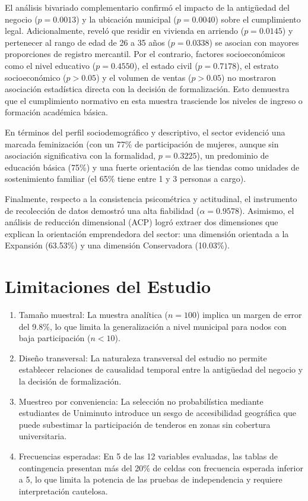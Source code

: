 \documentclass[11pt,a4paper]{article}
\begin{document}
\par
El análisis bivariado complementario confirmó el impacto de la antigüedad del negocio ($p = 0.0013$) y la ubicación municipal ($p = 0.0040$) sobre el cumplimiento legal. Adicionalmente, reveló que residir en vivienda en arriendo ($p = 0.0145$) y pertenecer al rango de edad de 26 a 35 años ($p = 0.0338$) se asocian con mayores proporciones de registro mercantil. Por el contrario, factores socioeconómicos como el nivel educativo ($p = 0.4550$), el estado civil ($p = 0.7178$), el estrato socioeconómico ($p > 0.05$) y el volumen de ventas ($p > 0.05$) no mostraron asociación estadística directa con la decisión de formalización. Esto demuestra que el cumplimiento normativo en esta muestra trasciende los niveles de ingreso o formación académica básica.

\par
En términos del perfil sociodemográfico y descriptivo, el sector evidenció una marcada feminización (con un 77\% de participación de mujeres, aunque sin asociación significativa con la formalidad, $p = 0.3225$), un predominio de educación básica (75\%) y una fuerte orientación de las tiendas como unidades de sostenimiento familiar (el 65\% tiene entre 1 y 3 personas a cargo).

\par
Finalmente, respecto a la consistencia psicométrica y actitudinal, el instrumento de recolección de datos demostró una alta fiabilidad ($\alpha = 0.9578$). Asimismo, el análisis de reducción dimensional (ACP) logró extraer dos dimensiones que explican la orientación emprendedora del sector: una dimensión orientada a la Expansión (63.53\%) y una dimensión Conservadora (10.03\%).

\section{Limitaciones del Estudio}
\begin{enumerate}
    \item Tamaño muestral: La muestra analítica ($n = 100$) implica un margen de error del 9.8\%, lo que limita la generalización a nivel municipal para nodos con baja participación ($n < 10$).
    \item Diseño transversal: La naturaleza transversal del estudio no permite establecer relaciones de causalidad temporal entre la antigüedad del negocio y la decisión de formalización.
    \item Muestreo por conveniencia: La selección no probabilística mediante estudiantes de Uniminuto introduce un sesgo de accesibilidad geográfica que puede subestimar la participación de tenderos en zonas sin cobertura universitaria.
    \item Frecuencias esperadas: En 5 de las 12 variables evaluadas, las tablas de contingencia presentan más del 20\% de celdas con frecuencia esperada inferior a 5, lo que limita la potencia de las pruebas de independencia y requiere interpretación cautelosa.
\end{enumerate}
\end{document}
